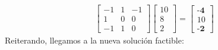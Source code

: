 \begin{homeworkProblem}
\begin{align*}
    \begin{bmatrix}
        -1 & 1 & -1 \\
        1 & 0 & 0 \\
        -1 & 1 & 0
    \end{bmatrix}
    \begin{bmatrix}
        10 \\
        8 \\
        2 	
    \end{bmatrix} = 
    \begin{bmatrix}
        \textbf{-4} \\
        10 \\
        \textbf{-2}
    \end{bmatrix}
\end{align*}
Reiterando, llegamos a la nueva solución factible:
\end{homeworkProblem}